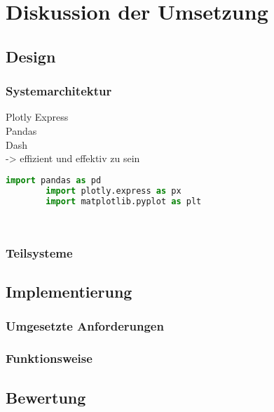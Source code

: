 \chapter{Diskussion der Umsetzung}
\label{chap:five}
\section{Design}
    \subsection{Systemarchitektur}
    Plotly Express\\
    Pandas\\
    Dash\\
    -> effizient und effektiv zu sein

    \begin{lstlisting}[language=Python, caption=Python example]
        import pandas as pd
        import plotly.express as px
        import matplotlib.pyplot as plt

        
    \end{lstlisting}

    \subsection{Teilsysteme}

\section{Implementierung}
    \subsection{Umgesetzte Anforderungen}
    \subsection{Funktionsweise}

\section{Bewertung}